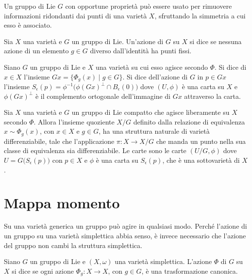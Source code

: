 Un gruppo di Lie $G$ con opportune proprietà può essere usato per rimuovere informazioni ridondanti dai punti di una varietà $X$, sfruttando la simmetria a cui esso è associato.
\begin{definition}
  Sia $X$ una varietà e $G$ un gruppo di Lie. Un'azione di $G$ su $X$ si dice  se nessuna azione di un elemento $g \in G$ diverso dall'identità ha punti fissi.
\end{definition}
\begin{definition}
  Siano $G$ un gruppo di Lie e $X$ una varietà su cui esso agisce secondo $\Phi$. Si dice  di $x \in X$ l'insieme $Gx = \{ \Phi_g(x)\mid g \in G\}$. Si dice  dell'azione di $G$ in $p \in Gx$ l'insieme $S_{\epsilon}(p) = \phi^{-1}\big(\phi(Gx)^{\perp} \cap B_{\epsilon}(0)\big)$ dove $(U,\phi)$ è una carta su $X$ e $\phi(Gx)^{\perp}$ è il complemento ortogonale dell'immagine di $Gx$ attraverso la carta.
\end{definition}
\begin{theorem}
  Sia $X$ una varietà e $G$ un gruppo di Lie compatto che agisce liberamente su $X$ secondo $\Phi$. Allora l'insieme quoziente $X/G$ definito dalla relazione di equivalenza $x \sim \Phi_g(x)$, con $x \in X$ e $g \in G$, ha una struttura naturale di varietà differenziabile, tale che l'applicazione $\pi:X \to X /G$ che manda un punto nella sua classe di equivalenza sia differenziabile. Le carte sono le carte $(U/G,\phi)$ dove $U = G\big(S_{\epsilon}(p)\big)$ con $p \in X$ e $\phi$ è una carta su $S_{\epsilon}(p)$, che è una sottovarietà di $X$.
\end{theorem}

\section{Mappa momento}
Su una varietà generica un gruppo può agire in qualsiasi modo. Perché l'azione di un gruppo su una varietà simplettica abbia senso, è invece necessario che l'azione del gruppo non cambi la struttura simplettica.
\begin{definition}
  Siano $G$ un gruppo di Lie e $(X, \omega)$ una varietà simplettica. L'azione $\Phi$ di $G$ su $X$ si dice  se ogni azione $\Phi_g:X\to X$, con $g \in G$, è una trasformazione canonica.
\end{definition}

